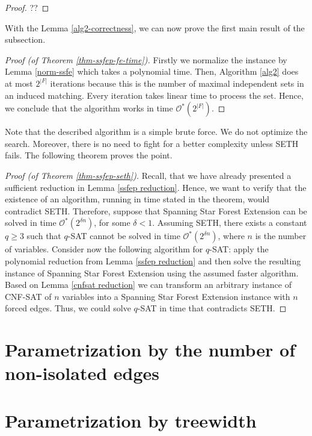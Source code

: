 \documentclass[en]{pracamgr}
\newcommand{\ssfep}{{\sc Spanning Star Forest Extension}}
\newcommand{\cnfsat}{{\sc CNF-SAT}}
\begin{document}
\begin{proof}
	??
\end{proof}

With the Lemma \ref{alg2-correctness}, we can now prove the first main result of the subsection.

\begin{proof}[Proof (of Theorem \ref{thm-ssfep-fe-time})]
	Firstly we normalize the instance by Lemma \ref{norm-ssfe} which takes a polynomial time. Then, Algorithm \ref{alg2} does at most $2^{|F|}$ iterations because this is the number of maximal independent sets in an induced matching. Every iteration takes linear time to process the set. Hence, we conclude that the algorithm works in time $\mathcal{O}^*(2^{|F|})$.
\end{proof}

Note that the described algorithm is a simple brute force. We do not optimize the search. Moreover, there is no need to fight for a better complexity unless SETH fails. The following theorem proves the point.

\begin{proof}[Proof (of Theorem \ref{thm-ssfep-seth})]
	Recall, that we have already presented a sufficient reduction in Lemma \ref{ssfep reduction}. Hence, we want to verify that the existence of an algorithm, running in time stated in the theorem, would contradict SETH. Therefore, suppose that \ssfep{} can be solved in time $\mathcal{O}^*(2^{\delta n})$, for some $\delta < 1$. Assuming SETH, there exists a constant $q \geq 3$ such that $q${\sc -SAT} cannot be solved in time $\mathcal{O}^*(2^{\delta n})$, where $n$ is the number of variables. Consider now the following algorithm for $q${\sc -SAT}: apply the polynomial reduction from Lemma \ref{ssfep reduction} and then solve the resulting instance of \ssfep{} using the assumed faster algorithm. Based on Lemma \ref{cnfsat reduction} we can transform an arbitrary instance of \cnfsat{} of $n$ variables into a \ssfep{} instance with $n$ forced edges. Thus, we could solve $q${\sc -SAT} in time that contradicts SETH.
\end{proof}

\section{Parametrization by the number of non-isolated edges}

\section{Parametrization by treewidth}

\begin{thebibliography}{99}


\end{thebibliography}
\end{document}

